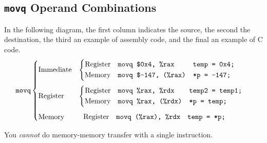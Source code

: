 \documentclass[class=article, crop=false]{standalone}
\begin{document}
  \subsection{\texttt{movq} Operand Combinations}
  In the following diagram, the first column indicates the source, the second the destination, the third an example of assembly code, and the final an example of C code.
  \[
    \texttt{movq} \begin{cases}
      \text{Immediate} & \begin{cases}\begin{aligned}
        \text{Register}&&& \texttt{movq \$0x4, \%rax} && \texttt{temp = 0x4;} \\
        \text{Memory} &&& \texttt{movq \$-147, (\%rax)} && \texttt{*p = -147;}
      \end{aligned}\end{cases} \\[15pt]
        \text{Register} & \begin{cases}\begin{aligned}
          \text{Register}&&& \texttt{movq \%rax, \%rdx} && \texttt{temp2 = temp1;} \\
          \text{Memory}&&& \texttt{movq \%rax, (\%rdx)} && \texttt{*p = temp;}
        \end{aligned}\end{cases} \\[15pt]
        \text{Memory} & \begin{aligned} 
          \hphantom{\begin{cases}\end{cases}}\text{Register} &&& \texttt{movq (\%rax), \%rdx} && \texttt{temp = *p;}
        \end{aligned}
    \end{cases}
  \]
  \begin{note}{}
    You \emph{cannot} do memory-memory transfer with a single instruction.
  \end{note}
\end{document}
